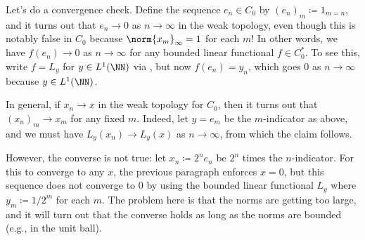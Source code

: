 \documentclass[../notes.tex]{subfiles}
\begin{document}
\begin{remark}
	Let's do a convergence check. Define the sequence $e_n\in C_0$ by $(e_n)_m\coloneqq1_{m=n}$, and it turns out that $e_n\to0$ as $n\to\infty$ in the weak topology, even though this is notably false in $C_0$ because $\norm{x_m}_\infty=1$ for each $m$! In other words, we have $f(e_n)\to0$ as $n\to\infty$ for any bounded linear functional $f\in C_0^*$. To see this, write $f=L_y$ for $y\in L^1(\NN)$ via , but now $f(e_n)=y_n$, which goes $0$ as $n\to\infty$ because $y\in L^1(\NN)$.
\end{remark}
\begin{remark}
	In general, if $x_n\to x$ in the weak topology for $C_0$, then it turns out that $(x_n)_m\to x_m$ for any fixed $m$. Indeed, let $y=e_m$ be the $m$-indicator as above, and we must have $L_y(x_n)\to L_y(x)$ as $n\to\infty$, from which the claim follows.

	However, the converse is not true: let $x_n\coloneqq2^ne_n$ be $2^n$ times the $n$-indicator. For this to converge to any $x$, the previous paragraph enforces $x=0$, but this sequence does not converge to $0$ by using the bounded linear functional $L_y$ where $y_m\coloneqq1/2^m$ for each $m$. The problem here is that the norms are getting too large, and it will turn out that the converse holds as long as the norms are bounded (e.g., in the unit ball).
\end{remark}
\end{document}
